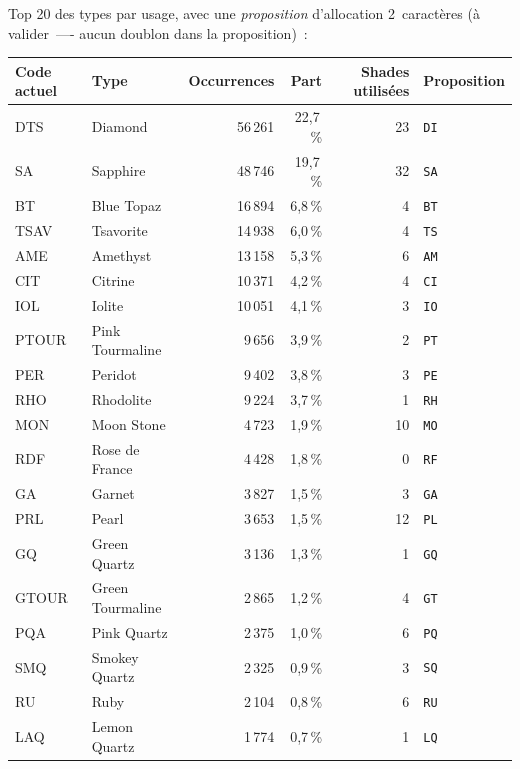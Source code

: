 \documentclass[11pt,a4paper]{article}
\newcommand{\code}[1]{\texttt{#1}}
\begin{document}
Top 20 des types par usage, avec une \emph{proposition} d'allocation
2~caractères (à valider~—- aucun doublon dans la proposition)~:

\begin{center}
\small
\begin{tabular}{l l r r r l}
\toprule
Code actuel & Type & Occurrences & Part & Shades utilisées & Proposition \\
\midrule
DTS   & Diamond          & 56\,261 & 22,7\,\% & 23 & \code{DI} \\
SA    & Sapphire         & 48\,746 & 19,7\,\% & 32 & \code{SA} \\
BT    & Blue Topaz       & 16\,894 &  6,8\,\% &  4 & \code{BT} \\
TSAV  & Tsavorite        & 14\,938 &  6,0\,\% &  4 & \code{TS} \\
AME   & Amethyst         & 13\,158 &  5,3\,\% &  6 & \code{AM} \\
CIT   & Citrine          & 10\,371 &  4,2\,\% &  4 & \code{CI} \\
IOL   & Iolite           & 10\,051 &  4,1\,\% &  3 & \code{IO} \\
PTOUR & Pink Tourmaline  &  9\,656 &  3,9\,\% &  2 & \code{PT} \\
PER   & Peridot          &  9\,402 &  3,8\,\% &  3 & \code{PE} \\
RHO   & Rhodolite        &  9\,224 &  3,7\,\% &  1 & \code{RH} \\
MON   & Moon Stone       &  4\,723 &  1,9\,\% & 10 & \code{MO} \\
RDF   & Rose de France   &  4\,428 &  1,8\,\% &  0 & \code{RF} \\
GA    & Garnet           &  3\,827 &  1,5\,\% &  3 & \code{GA} \\
PRL   & Pearl            &  3\,653 &  1,5\,\% & 12 & \code{PL} \\
GQ    & Green Quartz     &  3\,136 &  1,3\,\% &  1 & \code{GQ} \\
GTOUR & Green Tourmaline &  2\,865 &  1,2\,\% &  4 & \code{GT} \\
PQA   & Pink Quartz      &  2\,375 &  1,0\,\% &  6 & \code{PQ} \\
SMQ   & Smokey Quartz    &  2\,325 &  0,9\,\% &  3 & \code{SQ} \\
RU    & Ruby             &  2\,104 &  0,8\,\% &  6 & \code{RU} \\
LAQ   & Lemon Quartz     &  1\,774 &  0,7\,\% &  1 & \code{LQ} \\
\bottomrule
\end{tabular}
\end{center}
\end{document}
